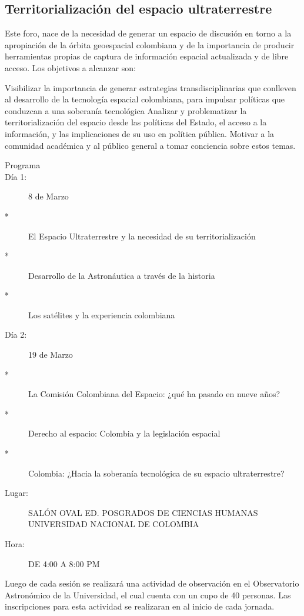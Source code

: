\documentclass{book}
\begin{document}
\subsection{Territorialización del espacio ultraterrestre}
Este foro, nace de la necesidad de generar un espacio de discusión en torno a la apropiación de la órbita geoespacial colombiana y de la importancia de producir herramientas propias de captura de información espacial actualizada y de libre acceso. Los objetivos a alcanzar son: 

    Visibilizar la importancia de generar estrategias transdisciplinarias que conlleven al desarrollo de la tecnología espacial colombiana, para impulsar políticas que conduzcan a una soberanía tecnológica
    Analizar y problematizar la territorialización del espacio desde las políticas del Estado, el acceso a la información, y las implicaciones de su uso en política pública.
    Motivar a la comunidad académica y al público general a tomar conciencia sobre estos temas.

\begin{description}
\item[Programa]
\item[Día 1:]  8 de Marzo\\
\item[*]El Espacio Ultraterrestre y la necesidad de su territorialización
\item[*]Desarrollo de la Astronáutica a través de la historia
\item[*]Los satélites y la experiencia colombiana


\item[Día 2:] 19 de Marzo
\item[*]La Comisión Colombiana del Espacio: ¿qué ha pasado en nueve años?
\item[*]Derecho al espacio: Colombia y la legislación espacial
\item[*]Colombia: ¿Hacia la soberanía tecnológica de su espacio ultraterrestre?\\
\item[Lugar:]SALÓN OVAL ED. POSGRADOS DE CIENCIAS HUMANAS\\
UNIVERSIDAD NACIONAL DE COLOMBIA
\item[Hora:] DE 4:00 A 8:00 PM
\end{description}

Luego de cada sesión se realizará una actividad de observación en el Observatorio Astronómico de la Universidad, el cual cuenta con un cupo de 40 personas. Las inscripciones para esta actividad se realizaran en al inicio de cada jornada.\\
\end{document}
